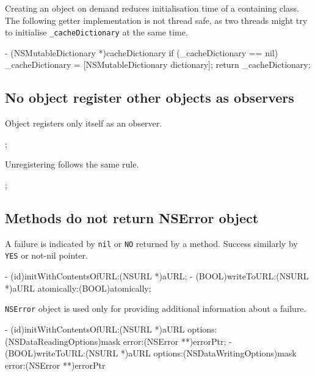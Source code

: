 \documentclass[10pt]{extarticle}
\newcommand{\inlinecode}[1]{{\textcolor{TundoraColor}{\texttt{#1}}}}
\begin{document}
Creating an object on demand reduces initialisation time of a containing class. The following getter implementation is not thread safe, as two threads might try to initialise \inlinecode{\_cacheDictionary} at the same time.

\begin{codelisting}
- (NSMutableDictionary *)cacheDictionary
{
    if (_cacheDictionary == nil) {
        _cacheDictionary = [NSMutableDictionary dictionary];
    }
    return _cacheDictionary;
}
\end{codelisting}


\subsection{No object register other objects as observers}

Object registers only itself as an observer.

\begin{codelisting}
;
\end{codelisting}

Unregistering follows the same rule.

\begin{codelisting}
;
\end{codelisting}


\subsection{Methods do not return NSError object}

A failure is indicated by \inlinecode{nil} or \inlinecode{NO} returned by a method. Success similarly by \inlinecode{YES} or not-nil pointer.

\begin{codelisting}
- (id)initWithContentsOfURL:(NSURL *)aURL;
- (BOOL)writeToURL:(NSURL *)aURL atomically:(BOOL)atomically;
\end{codelisting}

\inlinecode{NSError} object is used only for providing additional information about a failure.

\begin{codelisting}
- (id)initWithContentsOfURL:(NSURL *)aURL options:(NSDataReadingOptions)mask error:(NSError **)errorPtr;
- (BOOL)writeToURL:(NSURL *)aURL options:(NSDataWritingOptions)mask error:(NSError **)errorPtr
\end{codelisting}
\end{document}
